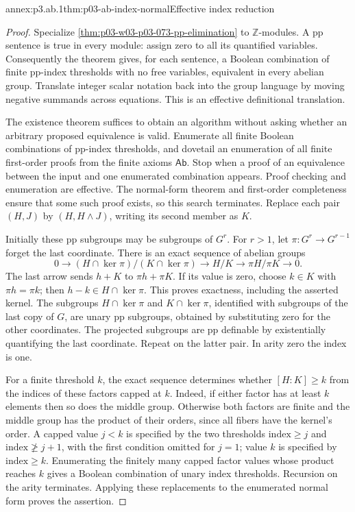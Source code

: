 \begin{annexitem}{annex:p3.ab.1}{thm:p03-ab-index-normal}{Effective index reduction}
\begin{proof}
Specialize \cref{thm:p03-w03-p03-073-pp-elimination} to
\(\mathbb Z\)-modules. A pp sentence is true in every module: assign
zero to all its quantified variables. Consequently the theorem gives,
for each sentence, a Boolean combination of finite pp-index thresholds
with no free variables, equivalent in every abelian group. Translate
integer scalar notation back into the group language by moving negative
summands across equations. This is an effective definitional translation.

The existence theorem suffices to obtain an algorithm without asking
whether an arbitrary proposed equivalence is valid. Enumerate all finite
Boolean combinations of pp-index thresholds, and dovetail an enumeration
of all finite first-order proofs from the finite axioms \(\mathsf{Ab}\).
Stop when a proof of an equivalence between the input and one enumerated
combination appears. Proof checking and enumeration are effective. The
normal-form theorem and first-order completeness ensure that some such
proof exists, so this search terminates. Replace each pair \((H,J)\) by
\((H,H\land J)\), writing its second member as \(K\).

Initially these pp subgroups may be subgroups of \(G^r\). For \(r>1\),
let \(\pi:G^r\longrightarrow G^{r-1}\) forget the last coordinate.
There is an exact sequence of abelian groups
\[
 0\longrightarrow
 (H\cap\ker\pi)/(K\cap\ker\pi)
 \longrightarrow H/K
 \longrightarrow \pi H/\pi K\longrightarrow0.
\]
The last arrow sends \(h+K\) to \(\pi h+\pi K\). If its value is zero,
choose \(k\in K\) with \(\pi h=\pi k\); then \(h-k\in H\cap\ker\pi\).
This proves exactness, including the asserted kernel. The subgroups
\(H\cap\ker\pi\) and \(K\cap\ker\pi\), identified with subgroups of
the last copy of \(G\), are unary pp subgroups, obtained by substituting
zero for the other coordinates. The projected subgroups are pp definable
by existentially quantifying the last coordinate. Repeat on the latter
pair. In arity zero the index is one.

For a finite threshold \(k\), the exact sequence determines whether
\([H:K]\geq k\) from the indices of these factors capped at \(k\).
Indeed, if either factor has at least \(k\) elements then so does the
middle group. Otherwise both factors are finite and the middle group
has the product of their orders, since all fibers have the kernel's
order. A capped value \(j<k\) is specified by the two thresholds
\(\text{index}\geq j\) and \(\text{index}\not\geq j+1\), with the
first condition omitted for \(j=1\); value \(k\) is specified by
\(\text{index}\geq k\). Enumerating the finitely many capped factor
values whose product reaches \(k\) gives a Boolean combination of unary
index thresholds. Recursion on the arity terminates. Applying these
replacements to the enumerated normal form proves the assertion.
\end{proof}
\end{annexitem}

